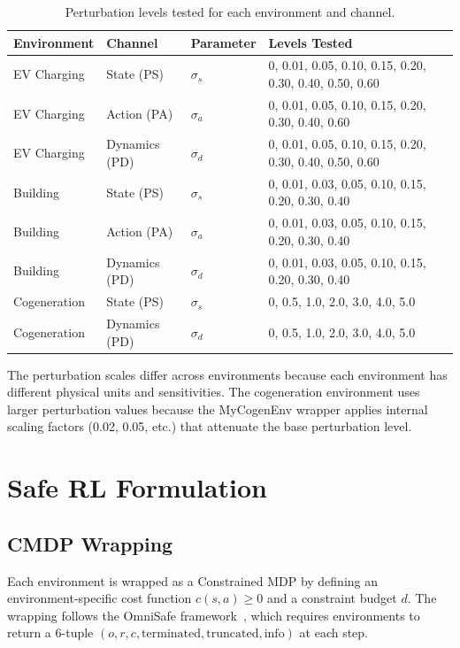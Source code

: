 \begin{table}[htbp]
\centering
\caption{Perturbation levels tested for each environment and channel.}
\label{tab:noise_levels}
\begin{tabular}{@{}llll@{}}
\toprule
\textbf{Environment} & \textbf{Channel} & \textbf{Parameter} & \textbf{Levels Tested} \\
\midrule
EV Charging & State (PS) & $\sigma_s$ & 0, 0.01, 0.05, 0.10, 0.15, 0.20, 0.30, 0.40, 0.50, 0.60 \\
EV Charging & Action (PA) & $\sigma_a$ & 0, 0.01, 0.05, 0.10, 0.15, 0.20, 0.30, 0.40, 0.60 \\
EV Charging & Dynamics (PD) & $\sigma_d$ & 0, 0.01, 0.05, 0.10, 0.15, 0.20, 0.30, 0.40, 0.50, 0.60 \\
\midrule
Building & State (PS) & $\sigma_s$ & 0, 0.01, 0.03, 0.05, 0.10, 0.15, 0.20, 0.30, 0.40 \\
Building & Action (PA) & $\sigma_a$ & 0, 0.01, 0.03, 0.05, 0.10, 0.15, 0.20, 0.30, 0.40 \\
Building & Dynamics (PD) & $\sigma_d$ & 0, 0.01, 0.03, 0.05, 0.10, 0.15, 0.20, 0.30, 0.40 \\
\midrule
Cogeneration & State (PS) & $\sigma_s$ & 0, 0.5, 1.0, 2.0, 3.0, 4.0, 5.0 \\
Cogeneration & Dynamics (PD) & $\sigma_d$ & 0, 0.5, 1.0, 2.0, 3.0, 4.0, 5.0 \\
\bottomrule
\end{tabular}
\end{table}

The perturbation scales differ across environments because each environment has different physical units and sensitivities. The cogeneration environment uses larger perturbation values because the MyCogenEnv wrapper applies internal scaling factors (0.02, 0.05, etc.) that attenuate the base perturbation level.

\section{Safe RL Formulation}
\label{sec:safe_rl}

\subsection{CMDP Wrapping}
\label{sec:cmdp_wrapping}

Each environment is wrapped as a Constrained MDP by defining an environment-specific cost function $c(s, a) \geq 0$ and a constraint budget $d$. The wrapping follows the OmniSafe framework~\citep{ji2023omnisafe}, which requires environments to return a 6-tuple $(o, r, c, \text{terminated}, \text{truncated}, \text{info})$ at each step.

